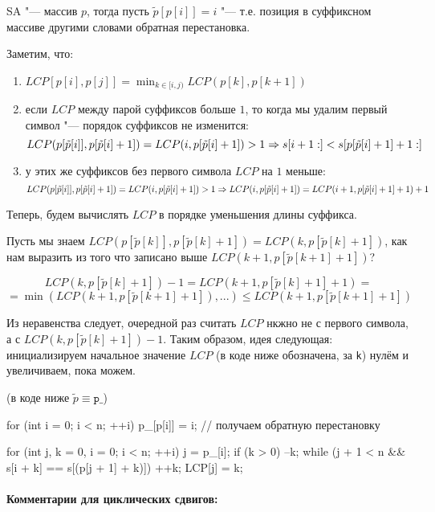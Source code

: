 SA "--- массив $p$, тогда пусть $\tilde{p}[p[i]] = i$ "--- т.е. позиция в суффиксном массиве другими словами обратная перестановка.

Заметим, что:
\begin{enumerate}
	\item $LCP[p[i], p[j]] = \min_{k \in [i, j)} LCP(p[k], p[k + 1])$
	\item если $LCP$ между парой суффиксов больше $1$, то когда мы удалим первый символ "--- порядок суффиксов не изменится:
			\[LCP(p[\tilde{p}[i]], p[\tilde{p}[i] + 1]) = LCP(i, p[\tilde{p}[i] + 1]) > 1 \Rightarrow s[i + 1:] < s[p[\tilde{p}[i] + 1] + 1:]\]

	
	\item у этих же суффиксов без первого символа $LCP$ на $1$ меньше:
		\[ LCP(p[\tilde{p}[i]], p[\tilde{p}[i] + 1]) = LCP(i, p[\tilde{p}[i] + 1]) > 1 \Rightarrow LCP(i, p[\tilde{p}[i] + 1]) = LCP(i + 1, p[\tilde{p}[i] + 1] + 1) + 1 \]
\end{enumerate} 

Теперь, будем вычислять $LCP$ в порядке уменьшения длины суффикса. 

Пусть мы знаем $LCP(p[\tilde{p}[k]], p[\tilde{p}[k] + 1]) = LCP(k, p[\tilde{p}[k] + 1])$, как нам выразить из 
того что записано выше $LCP(k + 1, p[\tilde{p}[k + 1] + 1])$?

\[ LCP(k, p[\tilde{p}[k] + 1]) - 1 = LCP(k + 1, p[\tilde{p}[k] + 1] + 1) =  \]
\[= \min (LCP(k + 1, p[\tilde{p}[k + 1] + 1]),...) \leq LCP(k + 1, p[\tilde{p}[k + 1] + 1]) \]

Из неравенства следует, очередной раз считать $LCP$ нкжно не с первого символа, а с $LCP(k, p[\tilde{p}[k] + 1]) - 1$.
Таким образом, идея следующая: инициализируем начальное значение $LCP$ (в коде ниже обозначена, за \texttt{k}) нулём и увеличиваем, пока можем.

(в коде ниже $\tilde{p} \equiv \texttt{p\_}$)
\begin{cppcode}
for (int i = 0; i < n; ++i) 
		p_[p[i]] = i;		// получаем обратную перестановку

for (int j, k = 0, i = 0; i < n; ++i) {
		j = p_[i];
		if (k > 0) --k;
		while (j + 1 < n && s[i + k] == s[(p[j + 1] + k)])
			++k;
		LCP[j] = k;
	}
\end{cppcode}

\paragraph*{Комментарии для циклических сдвигов:}

